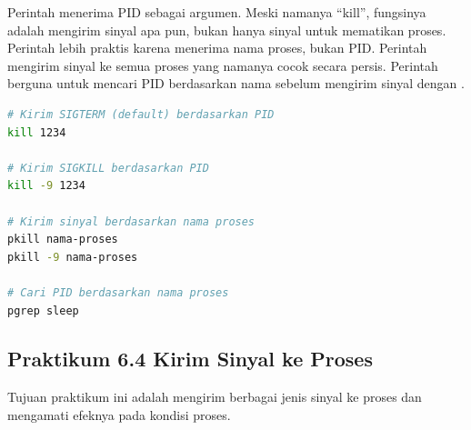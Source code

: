 Perintah  menerima PID sebagai argumen. Meski namanya ``kill'', fungsinya adalah
mengirim sinyal apa pun, bukan hanya sinyal untuk mematikan proses. Perintah 
lebih praktis karena menerima nama proses, bukan PID. Perintah  mengirim
sinyal ke semua proses yang namanya cocok secara persis. Perintah  berguna
untuk mencari PID berdasarkan nama sebelum mengirim sinyal dengan .

\begin{lstlisting}[language=bash, caption={Cara-cara mengirim sinyal}]
# Kirim SIGTERM (default) berdasarkan PID
kill 1234

# Kirim SIGKILL berdasarkan PID
kill -9 1234

# Kirim sinyal berdasarkan nama proses
pkill nama-proses
pkill -9 nama-proses

# Cari PID berdasarkan nama proses
pgrep sleep
\end{lstlisting}

\subsection*{Praktikum 6.4 Kirim Sinyal ke Proses}

Tujuan praktikum ini adalah mengirim berbagai jenis sinyal ke proses dan mengamati
efeknya pada kondisi proses.

